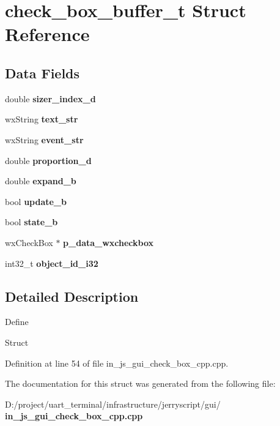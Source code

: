 \section{check\+\_\+box\+\_\+buffer\+\_\+t Struct Reference}
\label{structcheck__box__buffer__t}
\subsection*{Data Fields}
\begin{DoxyCompactItemize}
\item 
\mbox{\label{structcheck__box__buffer__t_aae99f717aadbf88f890c71a293468af8}} 
double {\bfseries sizer\+\_\+index\+\_\+d}
\item 
\mbox{\label{structcheck__box__buffer__t_ae027b01a16a8b9ded760f0ead4d7a951}} 
wx\+String {\bfseries text\+\_\+str}
\item 
\mbox{\label{structcheck__box__buffer__t_a43aba9d4f0f518678c2dd03b5bfd9e7e}} 
wx\+String {\bfseries event\+\_\+str}
\item 
\mbox{\label{structcheck__box__buffer__t_a93e3ac3895fbb25863fb66af78e0ed39}} 
double {\bfseries proportion\+\_\+d}
\item 
\mbox{\label{structcheck__box__buffer__t_a40506be5f1249944fed816e11465f5ca}} 
double {\bfseries expand\+\_\+b}
\item 
\mbox{\label{structcheck__box__buffer__t_a4aed9ad79f44786d35de6f7804904494}} 
bool {\bfseries update\+\_\+b}
\item 
\mbox{\label{structcheck__box__buffer__t_ad60c38399e569713ffb0f12e385ae907}} 
bool {\bfseries state\+\_\+b}
\item 
\mbox{\label{structcheck__box__buffer__t_a80974098335fc95203499304b1e4691f}} 
wx\+Check\+Box $\ast$ {\bfseries p\+\_\+data\+\_\+wxcheckbox}
\item 
\mbox{\label{structcheck__box__buffer__t_aa7683407966206b7eb17d410ee75d880}} 
int32\+\_\+t {\bfseries object\+\_\+id\+\_\+i32}
\end{DoxyCompactItemize}


\subsection{Detailed Description}
Define

Struct 

Definition at line 54 of file in\+\_\+js\+\_\+gui\+\_\+check\+\_\+box\+\_\+cpp.\+cpp.



The documentation for this struct was generated from the following file\+:\begin{DoxyCompactItemize}
\item 
D\+:/project/uart\+\_\+terminal/infrastructure/jerryscript/gui/\textbf{ in\+\_\+js\+\_\+gui\+\_\+check\+\_\+box\+\_\+cpp.\+cpp}\end{DoxyCompactItemize}
